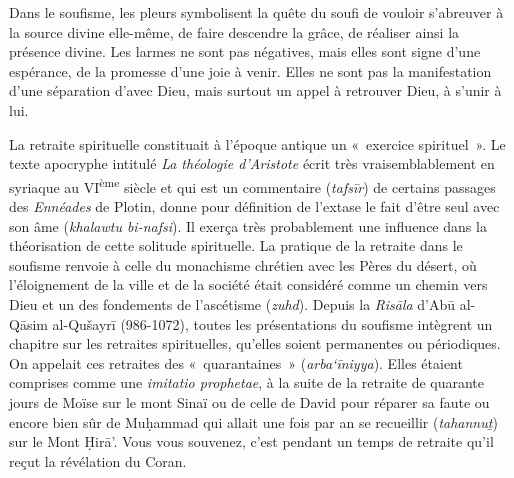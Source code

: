 Dans le soufisme, les pleurs symbolisent la quête du soufi de vouloir
s'abreuver à la source divine elle-même, de faire descendre la grâce, de
réaliser ainsi la présence divine. Les larmes ne sont pas négatives,
mais elles sont signe d'une espérance, de la promesse d'une joie à
venir. Elles ne sont pas la manifestation d'une séparation d'avec Dieu,
mais surtout un appel à retrouver Dieu, à s'unir à lui.


La retraite spirituelle constituait à l'époque antique un «~exercice
spirituel~». Le texte apocryphe intitulé \emph{La théologie d'Aristote}
écrit très vraisemblablement en syriaque au VI\textsuperscript{ème}
siècle et qui est un commentaire (\emph{tafsīr}) de certains passages
des \emph{Ennéades} de Plotin, donne pour définition de l'extase le
fait d'être seul avec son âme (\emph{khalawtu bi-nafsi}). Il exerça très probablement une influence
dans la théorisation de cette solitude spirituelle. La pratique de la
retraite dans le soufisme renvoie à celle du monachisme chrétien avec
les Pères du désert, où l'éloignement de la ville et de la société était
considéré comme un chemin vers Dieu et un des fondements de l'ascétisme
(\emph{zuhd}). Depuis la \emph{Risāla} d'Abū al-Qāsim al-Qušayrī
(986-1072), toutes les présentations du soufisme intègrent un chapitre
sur les retraites spirituelles, qu'elles soient permanentes ou
périodiques. On appelait ces retraites des «~quarantaines~»
(\emph{arba`īniyya}). Elles étaient comprises comme une \emph{imitatio
prophetae}, à la suite de la retraite de quarante jours de Moïse sur le
mont Sinaï ou de celle de David pour réparer sa faute ou encore bien sûr
de Muḥammad qui allait une fois par an se recueillir (\emph{tahannuṯ})
sur le Mont Ḥirā'. Vous vous souvenez, c'est pendant un temps de retraite
qu'il reçut la révélation du Coran.

